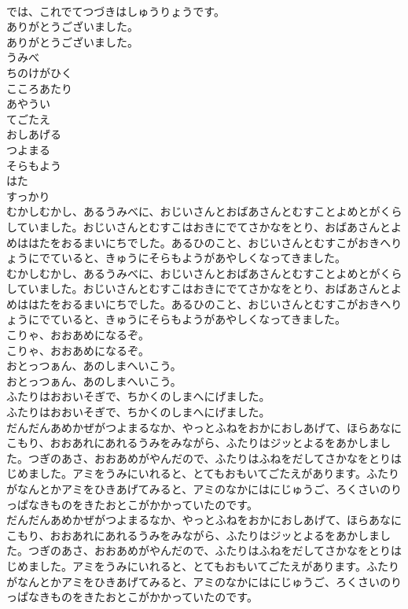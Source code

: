 \documentclass[8pt]{extreport}
\begin{document}
\begin{CJK}{UTF8}{min}
\\	では、これでてつづきはしゅうりょうです。 
\\	ありがとうございました。	
\\	ありがとうございました。 
\\	うみべ
\\	ちのけがひく
\\	こころあたり
\\	あやうい
\\	てごたえ
\\	おしあげる
\\	つよまる
\\	そらもよう
\\	はた
\\	すっかり
\\	むかしむかし、あるうみべに、おじいさんとおばあさんとむすことよめとがくらしていました。おじいさんとむすこはおきにでてさかなをとり、おばあさんとよめははたをおるまいにちでした。あるひのこと、おじいさんとむすこがおきへりょうにでていると、きゅうにそらもようがあやしくなってきました。	
\\	むかしむかし、あるうみべに、おじいさんとおばあさんとむすことよめとがくらしていました。おじいさんとむすこはおきにでてさかなをとり、おばあさんとよめははたをおるまいにちでした。あるひのこと、おじいさんとむすこがおきへりょうにでていると、きゅうにそらもようがあやしくなってきました。 
\\	こりゃ、おおあめになるぞ。	
\\	こりゃ、おおあめになるぞ。 
\\	おとっつぁん、あのしまへいこう。	
\\	おとっつぁん、あのしまへいこう。 
\\	ふたりはおおいそぎで、ちかくのしまへにげました。	
\\	ふたりはおおいそぎで、ちかくのしまへにげました。 
\\	だんだんあめかぜがつよまるなか、やっとふねをおかにおしあげて、ほらあなにこもり、おおあれにあれるうみをみながら、ふたりはジッとよるをあかしました。つぎのあさ、おおあめがやんだので、ふたりはふねをだしてさかなをとりはじめました。アミをうみにいれると、とてもおもいてごたえがあります。ふたりがなんとかアミをひきあげてみると、アミのなかにはにじゅうご、ろくさいのりっぱなきものをきたおとこがかかっていたのです。	
\\	だんだんあめかぜがつよまるなか、やっとふねをおかにおしあげて、ほらあなにこもり、おおあれにあれるうみをみながら、ふたりはジッとよるをあかしました。つぎのあさ、おおあめがやんだので、ふたりはふねをだしてさかなをとりはじめました。アミをうみにいれると、とてもおもいてごたえがあります。ふたりがなんとかアミをひきあげてみると、アミのなかにはにじゅうご、ろくさいのりっぱなきものをきたおとこがかかっていたのです。 

\end{CJK}
\end{document}
